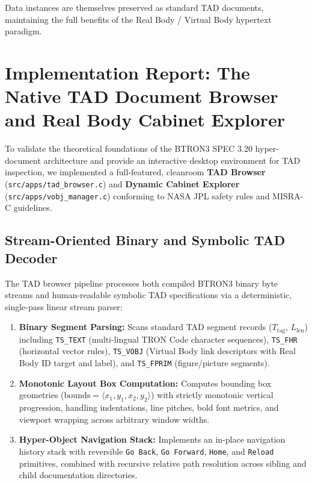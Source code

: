 \documentclass[10pt,journal,compsoc,twocolumn]{article}
\begin{document}
Data instances are themselves preserved as standard TAD documents, maintaining the full benefits of the Real Body / Virtual Body hypertext paradigm.

\section{Implementation Report: The Native TAD Document Browser and Real Body Cabinet Explorer}
\label{sec:implementation_report}

To validate the theoretical foundations of the BTRON3 SPEC 3.20 hyper-document architecture and provide an interactive desktop environment for TAD inspection, we implemented a full-featured, cleanroom \textbf{TAD Browser} (\texttt{src/apps/tad\_browser.c}) and \textbf{Dynamic Cabinet Explorer} (\texttt{src/apps/vobj\_manager.c}) conforming to NASA JPL safety rules and MISRA-C guidelines.

\subsection{Stream-Oriented Binary and Symbolic TAD Decoder}
The TAD browser pipeline processes both compiled BTRON3 binary byte streams and human-readable symbolic TAD specifications via a deterministic, single-pass linear stream parser:
\begin{enumerate}[leftmargin=*]
    \item \textbf{Binary Segment Parsing:} Scans standard TAD segment records ($T_{\text{tag}}$, $L_{\text{len}}$) including \texttt{TS\_TEXT} (multi-lingual TRON Code character sequences), \texttt{TS\_FHR} (horizontal vector rules), \texttt{TS\_VOBJ} (Virtual Body link descriptors with Real Body ID target and label), and \texttt{TS\_FPRIM} (figure/picture segments).
    \item \textbf{Monotonic Layout Box Computation:} Computes bounding box geometries ($\text{bounds} = \langle x_1, y_1, x_2, y_2 \rangle$) with strictly monotonic vertical progression, handling indentations, line pitches, bold font metrics, and viewport wrapping across arbitrary window widths.
    \item \textbf{Hyper-Object Navigation Stack:} Implements an in-place navigation history stack with reversible \texttt{Go Back}, \texttt{Go Forward}, \texttt{Home}, and \texttt{Reload} primitives, combined with recursive relative path resolution across sibling and child documentation directories.
\end{enumerate}
\end{document}
